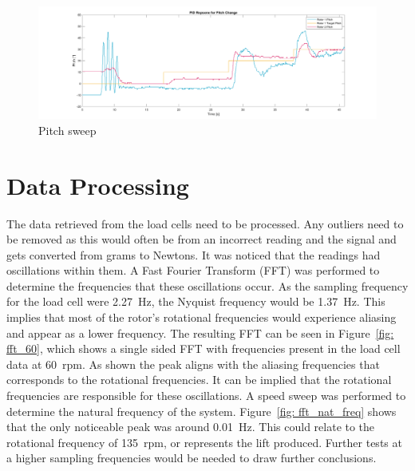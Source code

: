         \begin{figure}[h]
            \centering
            \includegraphics*[width = 1\textwidth]{figs/Data_Analysis/Pitch Graph-Pitch Sweep.png}
            \caption{Pitch sweep}
            \label{fig: pitch_sweep}
        \end{figure}
    \section{Data Processing}
        The data retrieved from the load cells need to be processed. Any outliers need to be removed as this would often be from an incorrect reading and the signal and gets converted from grams to Newtons. It was noticed that the readings had oscillations within them. A Fast Fourier Transform (FFT) was performed to determine the frequencies that these oscillations occur. As the sampling frequency for the load cell were 2.27~Hz, the Nyquist frequency would be 1.37~Hz. This implies that most of the rotor's rotational frequencies would experience aliasing and appear as a lower frequency. 
        The resulting FFT can be seen in Figure~\ref{fig: fft_60}, which shows a single sided FFT with frequencies present in the load cell data at 60~rpm. As shown the peak aligns with  the aliasing frequencies that corresponds to the rotational frequencies. It can be implied that the rotational frequencies are responsible for these oscillations. A speed sweep was performed to determine the natural frequency of the system. Figure~\ref{fig: fft_nat_freq} shows that the only noticeable peak was around 0.01~Hz. This could relate to the rotational frequency of 135~rpm, or represents the lift produced. Further tests at a higher sampling frequencies would be needed to draw further conclusions.\\
